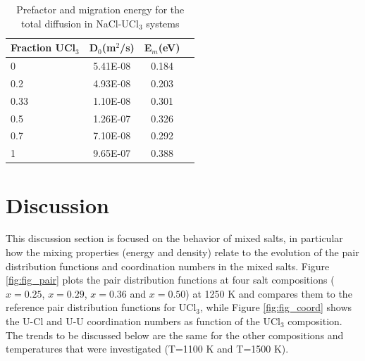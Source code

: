 \documentclass[preprint,3p,10pt,onecolumn,number,sort&compress]{elsarticle}
\begin{document}
\begin{table}[hb!]
\centering
\caption{Prefactor and migration energy for the total diffusion in NaCl-UCl$_3$ systems\color{red}{, where D = D$_0\times$exp(-E$_m$/(k$_b$T)).}}
\begin{tabular}{lccc|}
\hline
\hline
Fraction UCl$_3$	&	D$_0$(m$^2$/s)	&	E$_m$(eV)	\\
\hline
0	&	5.41E-08	&	0.184	\\
0.2	&	4.93E-08	&	0.203	\\
0.33	&	1.10E-08	&	0.301	\\
0.5	&	1.26E-07	&	0.326	\\
0.7	&	7.10E-08	&	0.292	\\
1	&	9.65E-07	&	0.388	\\
\hline
\hline
\end{tabular}
\label{table:diff}
\end{table}


\FloatBarrier

\section{Discussion}
\label{sec:discussion}
This discussion section is focused on the behavior of mixed salts, in particular how the mixing properties (energy and density) relate to the evolution of the pair distribution functions and coordination numbers in the mixed salts. Figure \ref{fig:fig_pair} plots the pair distribution functions at four salt compositions ($x=0.25$, $x=0.29$, $x=0.36$ and $x=0.50$) at 1250 K and compares them to the reference pair distribution functions for UCl$_3$, while Figure \ref{fig:fig_coord} shows the U-Cl and U-U coordination numbers as function of the UCl$_3$ composition. The trends to be discussed below are the same for the other compositions and temperatures that were investigated (T=1100 K and T=1500 K).
 
\end{document}
